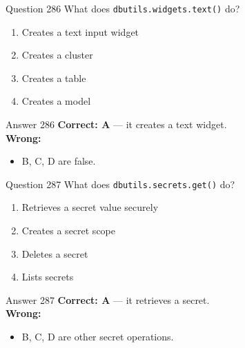 \documentclass[aspectratio=169,11pt]{beamer}
\begin{document}
	\begin{frame}{Question 286}
		What does \texttt{dbutils.widgets.text()} do?
		\begin{enumerate}[label=\Alph*.]
			\item Creates a text input widget
			\item Creates a cluster
			\item Creates a table
			\item Creates a model
		\end{enumerate}
	\end{frame}
	\begin{frame}{Answer 286}
		\textbf{Correct: A} --- it creates a text widget.\\
		\vspace{0.5em}
		\textbf{Wrong:}
		\begin{itemize}
			\item B, C, D are false.
		\end{itemize}
	\end{frame}
	
	\begin{frame}{Question 287}
		What does \texttt{dbutils.secrets.get()} do?
		\begin{enumerate}[label=\Alph*.]
			\item Retrieves a secret value securely
			\item Creates a secret scope
			\item Deletes a secret
			\item Lists secrets
		\end{enumerate}
	\end{frame}
	\begin{frame}{Answer 287}
		\textbf{Correct: A} --- it retrieves a secret.\\
		\vspace{0.5em}
		\textbf{Wrong:}
		\begin{itemize}
			\item B, C, D are other secret operations.
		\end{itemize}
	\end{frame}
	
\end{document}
